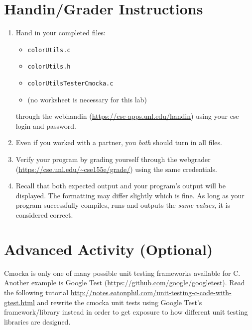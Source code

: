 \documentclass[12pt]{scrartcl}
\begin{document}
\section{Handin/Grader Instructions}

\begin{enumerate}
  \item Hand in your completed files:
  \begin{itemize}
    \item \texttt{colorUtils.c}
    \item \texttt{colorUtils.h}
    \item \texttt{colorUtilsTesterCmocka.c}
    \item (no worksheet is necessary for this lab)
  \end{itemize}
  through the webhandin (\url{https://cse-apps.unl.edu/handin}) 
  using your cse login and password.  
  \item Even if you worked with a partner, you \emph{both} should
  turn in all files.
  \item Verify your program by grading yourself through the
  webgrader (\url{https://cse.unl.edu/~cse155e/grade/}) using the
  same credentials.
  \item Recall that both expected output and your program's output
  will be displayed.  The formatting may differ slightly which is fine.
  As long as your program successfully compiles, runs and outputs 
  the \emph{same values}, it is considered correct.
\end{enumerate}

\section{Advanced Activity (Optional)}

Cmocka is only one of many possible unit testing frameworks available
for C.  Another example is Google Test 
(\url{https://github.com/google/googletest}).  Read the following tutorial 
\url{http://notes.eatonphil.com/unit-testing-c-code-with-gtest.html} and
rewrite the cmocka unit tests using Google Test's framework/library instead
in order to get exposure to how different unit testing libraries are designed.
\end{document}
